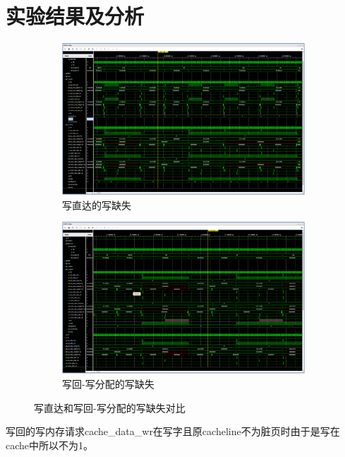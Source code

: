 \section{实验结果及分析}
\begin{figure}[H]
  \centering
  \begin{subfigure}[b]{0.8\textwidth}
    \centering
    \includegraphics[width=\textwidth]{image/wt_miss.png}
    \caption{写直达的写缺失}
    \label{fig:wtwm}
  \end{subfigure}
  \hfill
  \begin{subfigure}[b]{0.8\textwidth}
    \centering
    \includegraphics[width=\textwidth]{image/wb_miss.png}
    \caption{写回-写分配的写缺失}
    \label{fig:wbwm}
  \end{subfigure}
  \caption{写直达和写回-写分配的写缺失对比}
  \label{fig:miss}
\end{figure}
写回的写内存请求cache\_data\_wr在写字且原cacheline不为脏页时由于是写在cache中所以不为1。
